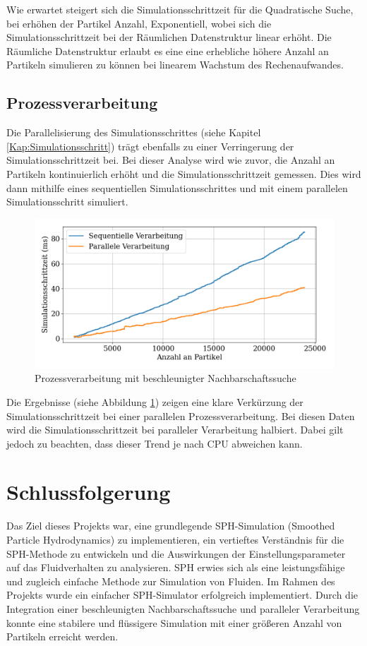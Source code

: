 \documentclass[a4paper, 12pt]{article}
\begin{document}
Wie erwartet steigert sich die Simulationsschrittzeit für die Quadratische Suche, bei erhöhen der Partikel Anzahl, Exponentiell, wobei sich die Simulationsschrittzeit bei der Räumlichen Datenstruktur linear erhöht. Die Räumliche Datenstruktur erlaubt es eine eine erhebliche höhere Anzahl an Partikeln simulieren zu können bei linearem Wachstum des Rechenaufwandes.  

\subsection{Prozessverarbeitung}
Die Parallelisierung des Simulationsschrittes (siehe Kapitel \ref{Kap:Simulationsschritt}) trägt ebenfalls zu einer Verringerung der Simulationsschrittzeit bei. Bei dieser Analyse wird wie zuvor, die Anzahl an Partikeln kontinuierlich erhöht und die Simulationsschrittzeit gemessen. Dies wird dann mithilfe eines sequentiellen Simulationsschrittes und mit einem parallelen Simulationsschritt simuliert.

\begin{figure}[H]
	\centering
	\includegraphics[width=.85\textwidth]{graphics/Prozessverarbeitung.png}
	\caption{Prozessverarbeitung mit beschleunigter Nachbarschaftssuche}
	\label{Prozessverarbeitung}
\end{figure}

Die Ergebnisse (siehe Abbildung \ref{Prozessverarbeitung}) zeigen eine klare Verkürzung der Simulationsschrittzeit bei einer parallelen Prozessverarbeitung. Bei diesen Daten wird die Simulationsschrittzeit bei paralleler Verarbeitung halbiert. Dabei gilt jedoch zu beachten, dass dieser Trend je nach CPU abweichen kann.  

\section{Schlussfolgerung}
Das Ziel dieses Projekts war, eine grundlegende SPH-Simulation (Smoothed Particle Hydrodynamics) zu implementieren, ein vertieftes Verständnis für die SPH-Methode zu entwickeln und die Auswirkungen der Einstellungsparameter auf das Fluidverhalten zu analysieren. SPH erwies sich als eine leistungsfähige und zugleich einfache Methode zur Simulation von Fluiden. Im Rahmen des Projekts wurde ein einfacher SPH-Simulator erfolgreich implementiert. Durch die Integration einer beschleunigten Nachbarschaftssuche und paralleler Verarbeitung konnte eine stabilere und flüssigere Simulation mit einer größeren Anzahl von Partikeln erreicht werden.
\end{document}

